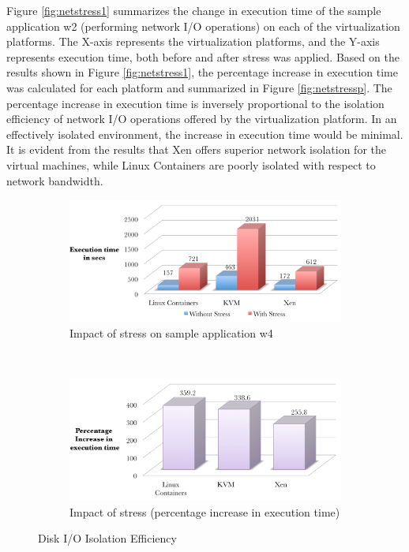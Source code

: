Figure \ref{fig:netstress1} summarizes the change in execution time of the sample application w2 (performing network I/O operations) on each of the virtualization platforms. The X-axis represents the virtualization platforms, and the Y-axis represents execution time, both before and after stress was applied. Based on the results shown in Figure \ref{fig:netstress1}, the percentage increase in execution time was calculated for each platform and summarized in Figure \ref{fig:netstressp}. The percentage increase in execution time is inversely proportional to the isolation efficiency of network I/O operations offered by the virtualization platform. In an effectively isolated environment, the increase in execution time would be minimal. It is evident from the results that Xen offers superior network isolation for the virtual machines, while Linux Containers are poorly isolated with respect to network bandwidth.


\begin{figure}[H]
        \centering
        \begin{subfigure}[b]{0.99\textwidth}
                \includegraphics[width=\textwidth]{diskstress.png}
                \caption{Impact of stress on sample application w4}
                \label{fig:diskstress1}
        \end{subfigure}%
        ~ %
        \qquad \newline %
        \begin{subfigure}[b]{0.8\textwidth}
                \includegraphics[width=\textwidth]{diskstressp.png}
                \caption{Impact of stress (percentage increase in execution time)}
                \label{fig:diskstressp}
        \end{subfigure}
        \caption{Disk I/O Isolation Efficiency}\label{fig:diskisolation}
\end{figure}

